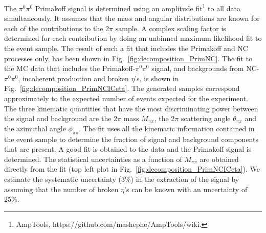 The $\pi^0\pi^0$ Primakoff signal is determined using an amplitude
fit\footnote{AmpTools, https://github.com/mashephe/AmpTools/wiki.} to
all data simultaneously. It assumes that the mass and angular
distributions are known for each of the contributions to the 2$\pi$
sample. A complex scaling factor is determined for each contribution
by doing an unbinned maximum likelihood fit to the event sample. The
result of such a fit that includes the Primakoff and NC
processes only, has been shown in Fig.~\ref{fig:decomposition_PrimNC}. The
fit to the MC data that includes the Primakoff-$\pi^0\pi^0$ signal,
and backgrounds from NC-$\pi^0\pi^0$, incoherent production and broken
$\eta$'s, is shown in Fig.~\ref{fig:decomposition_PrimNCICeta}. The
generated samples correspond approximately to the expected number of
events expected for the experiment. The three kinematic quantities
that have the most discriminating power between the signal and background
are the
2$\pi$ mass $M_{\pi\pi}$, the 2$\pi$ scattering angle
$\theta_{\pi\pi}$ and the azimuthal angle $\phi_{\pi\pi}$. The fit
uses all the kinematic information contained in the event sample to
determine the fraction of signal and background components that are
present. A good fit is obtained to the data and the Primakoff signal
is determined. The statistical uncertainties as a function of
$M_{\pi\pi}$ are obtained directly from the fit (top left plot in
Fig.~\ref{fig:decomposition_PrimNCICeta}). We estimate the systematic
uncertainty (3\%) in the extraction of the signal by assuming that the
number of broken $\eta$'s can be known with an uncertainty of 25\%.

